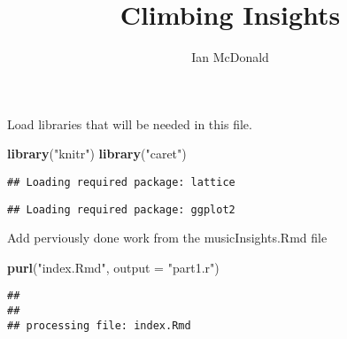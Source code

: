 \documentclass[]{article}
\title{Climbing Insights}
\author{Ian McDonald}
\date{}
\newenvironment{Shaded}{\begin{snugshade}}{\end{snugshade}}
\newcommand{\DataTypeTok}[1]{\textcolor[rgb]{0.13,0.29,0.53}{#1}}
\newcommand{\KeywordTok}[1]{\textcolor[rgb]{0.13,0.29,0.53}{\textbf{#1}}}
\newcommand{\NormalTok}[1]{#1}
\newcommand{\StringTok}[1]{\textcolor[rgb]{0.31,0.60,0.02}{#1}}
\begin{document}
\maketitle

Load libraries that will be needed in this file.

\begin{Shaded}
\begin{Highlighting}[]
\KeywordTok{library}\NormalTok{(}\StringTok{"knitr"}\NormalTok{)}
\KeywordTok{library}\NormalTok{(}\StringTok{"caret"}\NormalTok{)}
\end{Highlighting}
\end{Shaded}

\begin{verbatim}
## Loading required package: lattice
\end{verbatim}

\begin{verbatim}
## Loading required package: ggplot2
\end{verbatim}

Add perviously done work from the musicInsights.Rmd file

\begin{Shaded}
\begin{Highlighting}[]
\KeywordTok{purl}\NormalTok{(}\StringTok{"index.Rmd"}\NormalTok{, }\DataTypeTok{output =} \StringTok{"part1.r"}\NormalTok{)}
\end{Highlighting}
\end{Shaded}

\begin{verbatim}
## 
## 
## processing file: index.Rmd
\end{verbatim}
\end{document}
